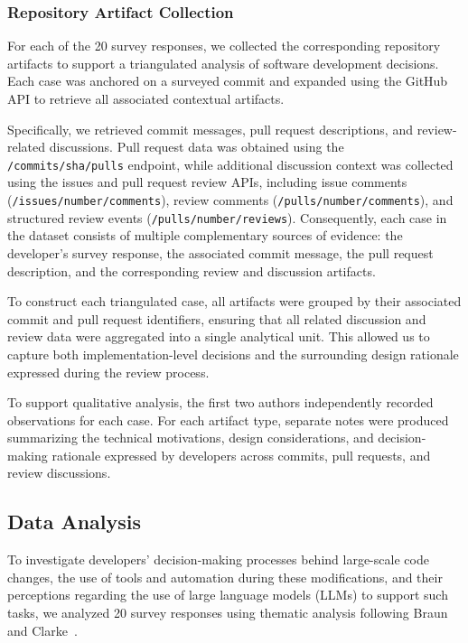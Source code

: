 \subsubsection{Repository Artifact Collection}

For each of the 20 survey responses, we collected the corresponding repository artifacts to support a triangulated analysis of software development decisions. Each case was anchored on a surveyed commit and expanded using the GitHub API to retrieve all associated contextual artifacts.

Specifically, we retrieved commit messages, pull request descriptions, and review-related discussions. Pull request data was obtained using the \texttt{/commits/{sha}/pulls} endpoint, while additional discussion context was collected using the issues and pull request review APIs, including issue comments (\texttt{/issues/{number}/comments}), review comments (\texttt{/pulls/{number}/comments}), and structured review events (\texttt{/pulls/{number}/reviews}). Consequently, each case in the dataset consists of multiple complementary sources of evidence: the developer's survey response, the associated commit message, the pull request description, and the corresponding review and discussion artifacts.

To construct each triangulated case, all artifacts were grouped by their associated commit and pull request identifiers, ensuring that all related discussion and review data were aggregated into a single analytical unit. This allowed us to capture both implementation-level decisions and the surrounding design rationale expressed during the review process.

To support qualitative analysis, the first two authors independently recorded observations for each case. For each artifact type, separate notes were produced summarizing the technical motivations, design considerations, and decision-making rationale expressed by developers across commits, pull requests, and review discussions.

\subsection{Data Analysis}
\label{subsec:data-analysis}

To investigate developers’ decision-making processes behind large-scale code changes, the use of tools and automation during these modifications, and their perceptions regarding the use of large language models (LLMs) to support such tasks, we analyzed 20 survey responses using thematic analysis following Braun and Clarke~\cite{Braun01012006}.


